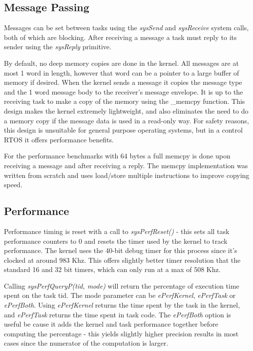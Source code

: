 \documentclass[twoside,a4paper]{refart}
\begin{document}
\subsection{Message Passing}
Messages can be set between tasks using the \textit{sysSend} and \textit{sysReceive} system calls, both of which are blocking. After receiving a message a task must reply to its sender using the \textit{sysReply} primitive.

By default, no deep memory copies are done in the kernel. All messages are at most 1 word in length, however that word can be a pointer to a large buffer of memory if desired. When the kernel sends a message it copies the message type and the 1 word message body to the receiver’s message envelope. It is up to the receiving task to make a copy of the memory using the \_memcpy function. This design makes the kernel extremely lightweight, and also eliminates the need to do a memory copy if the message data is used in a read-only way. For safety reasons, this design is unsuitable for general purpose operating systems, but in a control RTOS it offers performance benefits.

For the performance benchmarks with 64 bytes a full memcpy is done upon receiving a message and after receiving a reply. The memcpy implementation was written from scratch and uses load/store multiple instructions to improve copying speed.

\subsection{Performance}
Performance timing is reset with a call to \textit{sysPerfReset()} - this sets all task performance counters to 0 and resets the timer used by the kernel to track performance. The kernel uses the 40-bit debug timer for this process since it’s clocked at around 983 Khz. This offers slightly better timer resolution that the standard 16 and 32 bit timers, which can only run at a max of 508 Khz.

Calling \textit{sysPerfQueryP(tid, mode)} will return the percentage of execution time spent on the task tid. The mode parameter can be \textit{ePerfKernel}, \textit{ePerfTask} or \textit{ePerfBoth}. Using \textit{ePerfKernel} returns the time spent by the task in the kernel, and \textit{ePerfTask} returns the time spent in task code. The \textit{ePerfBoth} option is useful be cause it adds the kernel and task performance together before computing the percentage - this yields slightly higher precision results in most cases since the numerator of the computation is larger.
\end{document}
